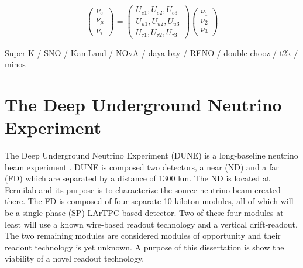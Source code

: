 
\begin{equation}
\begin{pmatrix}
\nu_e\\
\nu_{\mu}\\
\nu_{\tau}
\end{pmatrix}
=
\begin{pmatrix}
U_{e1}, U_{e2}, U_{e3} \\
U_{u1}, U_{u2}, U_{u3} \\
U_{\tau1}, U_{\tau2}, U_{\tau3}
\end{pmatrix}
\begin{pmatrix}
\nu_1\\
\nu_2\\
\nu_3
\end{pmatrix}
\end{equation}

Super-K / SNO / KamLand / NOvA / daya bay / RENO / double chooz / t2k / minos

\citep{SNO_2002_neutrino_PhysRevLett.89.011301, neutrino_measurement_NOvA_2019_prl, t2k_2011_neutrino_PhysRevLett.107.041801}
\cite{reno_2012_neutrino_PhysRevLett.108.191802}
\citep{FUKUDA2002_solar_neutrino_oscillation}
\citep{kamland_2003_neutrino_PhysRevLett.90.021802}
\citep{daya_bay_2012_neutrino_PhysRevLett.108.171803}
\citep{doubleChooz_2012_neutrino_PhysRevLett.108.131801}





\section{The Deep Underground Neutrino Experiment}

The Deep Underground Neutrino Experiment (DUNE) is a long-baseline neutrino beam experiment \cite{DUNE_TDR_V1_Abi_2020, DUNE_FD_TDRv2_2020, DUNE_TDRv3_Abi_2020, DUNE-FD_TDRv4:Abi_2020}. 
DUNE is composed two detectors, a near (ND) and a far (FD) which are separated by a distance of 1300 km. 
The ND is located at Fermilab and its purpose is to characterize the source neutrino beam created there.
The FD is composed of four separate 10 kiloton modules, all of which will be a single-phase (SP) LArTPC based detector.
Two of these four modules at least will use a known wire-based readout technology and a vertical drift-readout.
The two remaining modules are considered modules of opportunity and their readout technology is yet unknown.
A purpose of this dissertation is show the viability of a novel readout technology.


